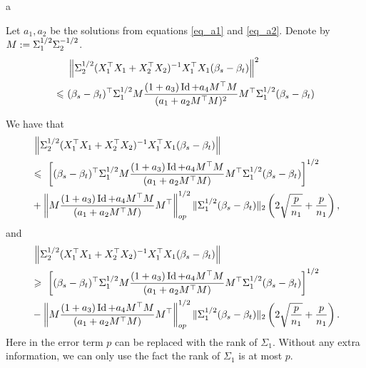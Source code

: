 \begin{theorem}
	a
\end{theorem}

\begin{lemma}
	Let $a_1, a_2$ be the solutions from equations \eqref{eq_a1} and \eqref{eq_a2}.
	Denote by $M := \Sigma_1^{1/2}\Sigma_2^{-1/2}$.
	\begin{align*}
		&~ \left\| \Sigma_2^{1/2} (X_1^{\top}X_1 + X_2^{\top}X_2)^{-1}X_1^{\top}X_1(\beta_s - \beta_t) \right\|^2 \\
		\leqslant &~ (\beta_s - \beta_t)^{\top} \Sigma_1^{1/2} M \frac{(1 + a_3)\operatorname{Id} + a_4 M^{\top}M}{(a_1 + a_2 M^{\top}M)^2} M^{\top} \Sigma_1^{1/2} (\beta_s - \beta_t)
	\end{align*}


	We have that
	\begin{align*}
		&~ {\left\| \Sigma_2^{1/2} (X_1^{\top}X_1 + X_2^{\top}X_2)^{-1} X_1^{\top}X_1 (\beta_s - \beta_t) \right\|} \\
		&\leqslant ~ \left[(\beta_s - \beta_t)^{\top}\Sigma_1^{1/2}M\frac{(1 + a_3)\operatorname{Id} + a_4 M^{\top}M}{(a_1 + a_2 M^{\top}M)} M^{\top}\Sigma_1^{1/2} (\beta_s - \beta_t)\right]^{1/2} \\
		&+ \left\|M\frac{(1 + a_3)\operatorname{Id} + a_4 M^{\top}M}{(a_1 + a_2 M^{\top}M)} M^{\top}\right\|_{op}^{1/2} \|\Sigma_1^{1/2} (\beta_s - \beta_t)\|_2 \left( 2\sqrt{\frac{p} {n_1}} + \frac{p}{n_1}\right),
	\end{align*}
	and
	\begin{align*}
		&~ {\left\| \Sigma_2^{1/2} (X_1^{\top}X_1 + X_2^{\top}X_2)^{-1} X_1^{\top}X_1 (\beta_s - \beta_t) \right\|} \\
		&\geqslant ~ \left[(\beta_s - \beta_t)^{\top}\Sigma_1^{1/2}M\frac{(1 + a_3)\operatorname{Id} + a_4 M^{\top}M}{(a_1 + a_2 M^{\top}M)} M^{\top}\Sigma_1^{1/2} (\beta_s - \beta_t)\right]^{1/2} \\
		&- \left\|M\frac{(1 + a_3)\operatorname{Id} + a_4 M^{\top}M}{(a_1 + a_2 M^{\top}M)} M^{\top}\right\|_{op}^{1/2} \|\Sigma_1^{1/2} (\beta_s - \beta_t)\|_2 \left( 2\sqrt{\frac{p} {n_1}} + \frac{p}{n_1}\right).
	\end{align*}
	Here in the error term $p$ can be replaced with the rank of $\Sigma_1$. Without any extra information, we can only use the fact the rank of $\Sigma_1$ is at most $p$.
	

\end{lemma}
